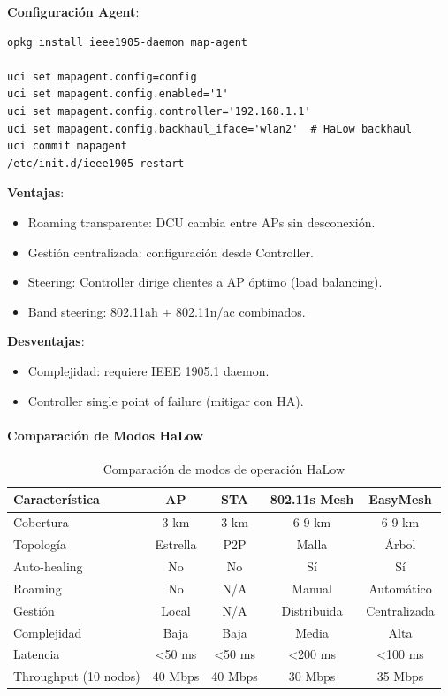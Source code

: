 \textbf{Configuración Agent}:
\begin{verbatim}
opkg install ieee1905-daemon map-agent

uci set mapagent.config=config
uci set mapagent.config.enabled='1'
uci set mapagent.config.controller='192.168.1.1'
uci set mapagent.config.backhaul_iface='wlan2'  # HaLow backhaul
uci commit mapagent
/etc/init.d/ieee1905 restart
\end{verbatim}

\textbf{Ventajas}:
\begin{itemize}
    \item Roaming transparente: DCU cambia entre APs sin desconexión.
    \item Gestión centralizada: configuración desde Controller.
    \item Steering: Controller dirige clientes a AP óptimo (load balancing).
    \item Band steering: 802.11ah + 802.11n/ac combinados.
\end{itemize}

\textbf{Desventajas}:
\begin{itemize}
    \item Complejidad: requiere IEEE 1905.1 daemon.
    \item Controller single point of failure (mitigar con HA).
\end{itemize}

\paragraph{Comparación de Modos HaLow}

\begin{table}[h]
\centering
\small
\begin{tabular}{|l|c|c|c|c|}
\hline
\textbf{Característica} & \textbf{AP} & \textbf{STA} & \textbf{802.11s Mesh} & \textbf{EasyMesh} \\
\hline
Cobertura & 3 km & 3 km & 6-9 km & 6-9 km \\
Topología & Estrella & P2P & Malla & Árbol \\
Auto-healing & No & No & Sí & Sí \\
Roaming & No & N/A & Manual & Automático \\
Gestión & Local & N/A & Distribuida & Centralizada \\
Complejidad & Baja & Baja & Media & Alta \\
Latencia & <50 ms & <50 ms & <200 ms & <100 ms \\
Throughput (10 nodos) & 40 Mbps & 40 Mbps & 30 Mbps & 35 Mbps \\
\hline
\end{tabular}
\caption{Comparación de modos de operación HaLow}
\end{table}

